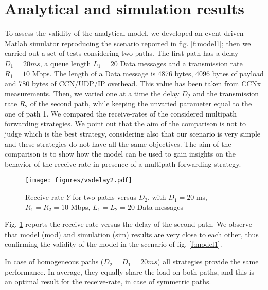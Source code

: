 \documentclass{sig-alternate-10pt}
\begin{document}
\section{Analytical and simulation results}
\label{s:Analytical and simulation results}
To assess the validity of the analytical model, we developed an event-driven Matlab simulator reproducing the scenario reported in fig. \ref{f:model1}; then we carried out a set of tests considering two paths. The first path has a delay $D_1=20ms$, a queue length $L_1 = 20$ Data messages and a transmission rate $R_1 = 10$ Mbps. The length of a Data message is 4876 bytes, 4096 bytes of payload and 780 bytes of CCN/UDP/IP overhead. This value has been taken from CCNx measurements. Then, we varied one at a time the delay $D_2$ and the transmission rate $R_2$ of the second path, while keeping the unvaried parameter equal to the one of path 1.
We compared the receive-rates of the considered multipath forwarding strategies. We point out that the aim of the comparison is not to judge which is the best strategy, considering also that our scenario is very simple and these strategies do not have all the same objectives. The aim of the comparison is to show how the model can be used to gain insights on the behavior of the receive-rate in presence of a multipath forwarding strategy.        

\begin{figure}[t]
\centering
\texttt{[image: figures/vsdelay2.pdf]}
\caption{Receive-rate $Y$ for two paths versus $D_2$, with $D_1=20$ ms, $R_1=R_2=10$ Mbps, $L_1=L_2=20$ Data messages}
\label{f:vsdelay}
\vspace{-10pt}
\end{figure}

Fig. \ref{f:vsdelay} reports the receive-rate versus the delay of the second path. We observe that model (mod) and simulation (sim) results are very close to each other, thus confirming the validity of the model in the scenario of fig. \ref{f:model1}.

In case of homogeneous paths ($D_2=D_1=20 ms$) all strategies provide the same performance. In average, they equally share the load on both paths, and this is an optimal result for the receive-rate, in case of symmetric paths.
\end{document}

